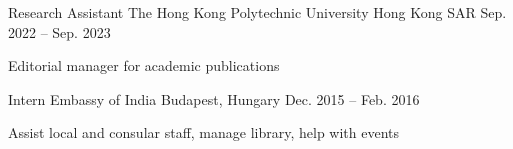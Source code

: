 
\begin{cventries}

  \cventry
    {Research Assistant} %
    {The Hong Kong Polytechnic University} %
    {Hong Kong SAR} %
    {Sep. 2022 -- Sep. 2023} %
    {
      \begin{cvitems} %
        \item {Editorial manager for academic publications}
      \end{cvitems}
    }

  \cventry
    {Intern} %
    {Embassy of India} %
    {Budapest, Hungary} %
    {Dec. 2015 -- Feb. 2016} %
    {
      \begin{cvitems} %
        \item {Assist local and consular staff, manage library, help with events}
      \end{cvitems}
    }

\end{cventries}
